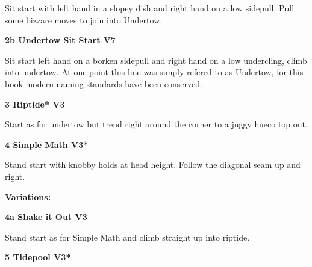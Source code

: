 \begin{multicols}{2}
\begin{adjustwidth}{0.5cm}{}
\begin{minipage}{\linewidth}
							\begin{adjustwidth}{0.5cm}{}				
							Sit start with left hand in a slopey dish and right hand on a low sidepull. Pull some bizzare moves to join into Undertow.
							\end{adjustwidth}
							\end{minipage}
							\begin{minipage}{\linewidth}	
							\label{vr:Undertow Sit Start}
\colorbox{Goldenrod!50}{
\parbox{0.95\textwidth}{
\textbf{
2b Undertow Sit Start V7     
}
}
}

							\begin{adjustwidth}{0.5cm}{}				
							Sit start left hand on a borken sidepull and right hand on a low undercling, climb into undertow. At one point this line was simply refered to as Undertow, for this book modern naming standards have been conserved.
							\end{adjustwidth}
							\end{minipage}
						\end{adjustwidth}
					\begin{minipage}{\linewidth}	
					\label{rt:Riptide}
\colorbox{green!20}{
\parbox{0.95\textwidth}{
\textbf{
3 Riptide* V3    
}
}
}

					\begin{adjustwidth}{0.5cm}{}				
					Start as for undertow but trend right around the corner to a juggy hueco top out.
					\end{adjustwidth}
					\end{minipage}
					\begin{minipage}{\linewidth}	
					\label{rt:Simple Math}
\colorbox{green!20}{
\parbox{0.95\textwidth}{
\textbf{
4 Simple Math V3*  
}
}
}

					\begin{adjustwidth}{0.5cm}{}				
					Stand start with knobby holds at head height. Follow the diagonal seam up and right.
					\end{adjustwidth}
					\end{minipage}
						\begin{adjustwidth}{0.5cm}{}				
						\textbf{Variations:} \newline
							\begin{minipage}{\linewidth}	
							\label{vr:Shake it Out}
\colorbox{green!20}{
\parbox{0.95\textwidth}{
\textbf{
4a Shake it Out V3   
}
}
}

							\begin{adjustwidth}{0.5cm}{}				
							Stand start as for Simple Math and climb straight up into riptide.
							\end{adjustwidth}
							\end{minipage}
						\end{adjustwidth}
					\begin{minipage}{\linewidth}	
					\label{rt:Tidepool}
\colorbox{green!20}{
\parbox{0.95\textwidth}{
\textbf{
5 Tidepool V3*  
}
}
}


\end{minipage}
\end{multicols}
